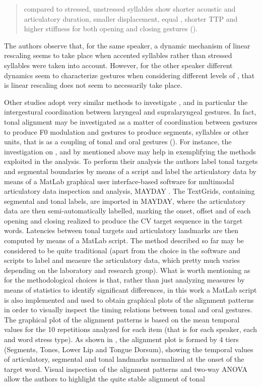 \documentclass[output=paper]{langsci/langscibook}
\begin{document}
\begin{quote}
compared to stressed, unstressed syllables show shorter acoustic and articulatory duration, smaller displacement, equal , shorter TTP and higher stiffness for both opening and closing gestures (\citealt[983]{Avesani2007}).
\end{quote}

The authors observe that, for the same speaker, a dynamic mechanism of linear rescaling seems to take place when accented syllables rather than stressed syllables were taken into account. However, for the other speaker different dynamics seem to characterize gestures when considering different levels of , that is linear rescaling does not seem to necessarily take place.

Other studies adopt very similar methods to investigate , and in particular the intergestural coordination between laryngeal and supralaryngeal gestures. In fact, tonal alignment may be investigated as a matter of coordination between gestures to produce F0 modulation and gestures to produce segments, syllables or other units, that is as a coupling of tonal and oral gestures (\citealt{DImperio2002,Ladd2008,PrietoTorreira2007}). For instance, the investigation on ,  and  by \citet{Stella2014} mentioned above may help in exemplifying the methods exploited in the analysis. To perform their analysis the authors label tonal targets and segmental boundaries by means of a  script and label the articulatory data by means of a MatLab graphical user interface-based software for multimodal articulatory data inspection and analysis, MAYDAY \citep{Sigona2015}. The  TextGrids, containing segmental and tonal labels, are imported in MAYDAY, where the articulatory data are then semi-automatically labelled, marking the onset, offset and  of each opening and closing  realized to produce the CV target sequence in the target words. Latencies between tonal targets and articulatory landmarks are then computed by means of a MatLab script. The method described so far may be considered to be quite traditional (apart from the choice in the software and scripts to label and measure the articulatory data, which pretty much varies depending on the laboratory and research group). What is worth mentioning as for the methodological choices is that, rather than just analyzing measures by means of statistics to identify significant differences, in this work a MatLab script is also implemented and used to obtain graphical plots of the alignment patterns in order to visually inspect the timing relations between tonal and oral gestures. The graphical plot of the alignment patterns is based on the mean temporal values for the 10 repetitions analyzed for each item (that is for each speaker, each  and word stress type). As shown in , the alignment plot is formed by 4 tiers (Segments, Tones, Lower Lip and Tongue Dorsum), showing the temporal values of articulatory, segmental and tonal landmarks normalized at the onset of the target word. Visual inspection of the alignment patterns and two-way ANOVA allow the authors to highlight the quite stable alignment of tonal 
\end{document}

